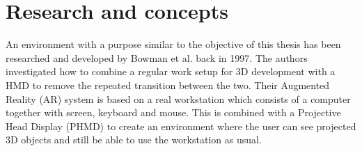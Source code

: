 \section{Research and concepts}
An environment with a purpose similar to the objective of this thesis has been researched and developed by Bowman et al. back in 1997. \cite{relatedwork:kijimaand1997transition} The authors investigated how to combine a regular work setup for 3D development with a HMD to remove the repeated transition between the two. Their Augmented Reality (AR) system is based on a real workstation which consists of a computer together with screen, keyboard and mouse. This is combined with a Projective Head Display (PHMD) to create an environment where the user can see projected 3D objects and still be able to use the workstation as usual.    
